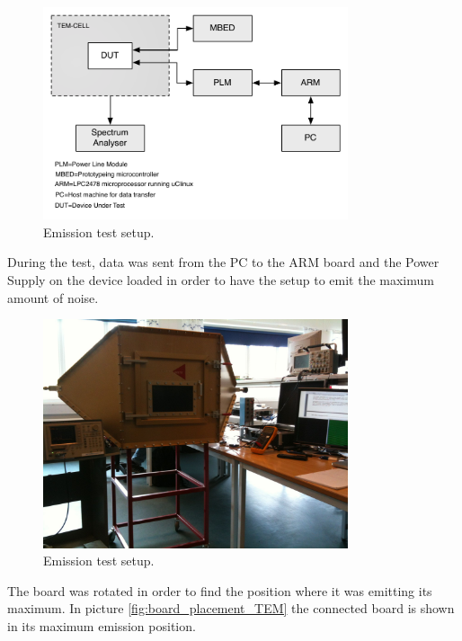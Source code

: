 \begin{figure}[H]
	\begin{centering}
		 \includegraphics[width=0.8\textwidth]{images/emission_setup.pdf}
		\caption{Emission test setup.}
	\label{fig:emission_setup}
	\end{centering}
\end{figure}
During the test, data was sent from the PC to the ARM board and the Power Supply on the device loaded in order to have the setup to emit the maximum amount of noise. 
\begin{figure}[H]
	\begin{centering}
		 \includegraphics[width=0.8\textwidth]{images/tem_celle_radiation.jpg}
		\caption{Emission test setup.}
	\end{centering}
\end{figure}
The board was rotated in order to find the position where it was emitting its maximum. In picture \ref{fig:board_placement_TEM} the connected board is shown in its maximum emission position. 
